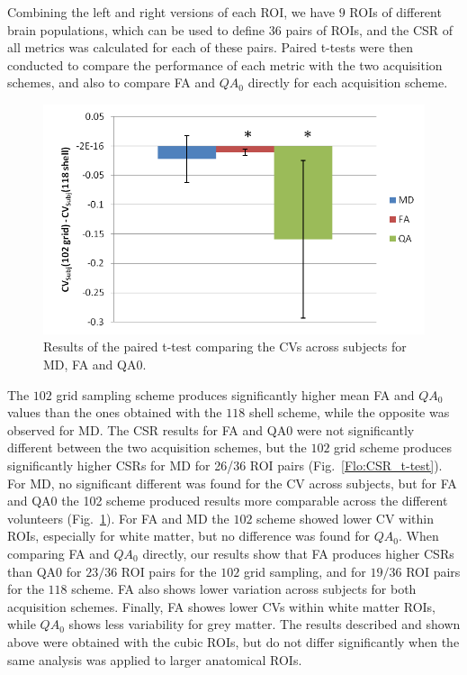 \documentclass{bioinfo}
\begin{document}
Combining the left and right versions of each ROI, we have $9$ ROIs
of different brain populations, which can be used to define $36$
pairs of ROIs, and the CSR of all metrics was calculated for each
of these pairs. Paired t-tests were then conducted to compare the
performance of each metric with the two acquisition schemes, and also
to compare FA and $QA_{0}$ directly for each acquisition scheme. 

%
\begin{figure}
[th!]

\begin{centering}
\includegraphics{figures/MartaISMRM1}
\par\end{centering}

\caption{Results of the paired t-test comparing the CVs across subjects for
MD, FA and QA0.}


\label{Flo:t-test_QA0}
\end{figure}


The $102$ grid sampling scheme produces significantly higher mean
FA and $QA_{0}$ values than the ones obtained with the $118$ shell
scheme, while the opposite was observed for MD. The CSR results for
FA and QA0 were not significantly different between the two acquisition
schemes, but the $102$ grid scheme produces significantly higher
CSRs for MD for 26/36 ROI pairs (Fig.~\ref{Flo:CSR_t-test}). For
MD, no significant different was found for the CV across subjects,
but for FA and QA0 the 102 scheme produced results more comparable
across the different volunteers (Fig.~\ref{Flo:t-test_QA0}). For
FA and MD the $102$ scheme showed lower CV within ROIs, especially
for white matter, but no difference was found for $QA_{0}$. When
comparing FA and $QA_{0}$ directly, our results show that FA produces
higher CSRs than QA0 for $23/36$ ROI pairs for the $102$ grid sampling,
and for $19/36$ ROI pairs for the $118$ scheme. FA also shows lower
variation across subjects for both acquisition schemes. Finally, FA
showes lower CVs within white matter ROIs, while $QA_{0}$ shows less
variability for grey matter. The results described and shown above
were obtained with the cubic ROIs, but do not differ significantly
when the same analysis was applied to larger anatomical ROIs.
\end{document}

